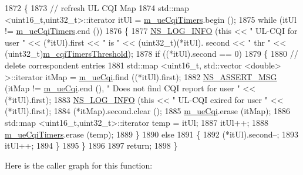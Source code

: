 \begin{DoxyCode}
1872 \{
1873   \textcolor{comment}{// refresh UL CQI  Map}
1874   std::map <uint16\_t,uint32\_t>::iterator itUl = \hyperlink{classns3_1_1RrFfMacScheduler_a348744ac7d5fc0c7d00d6df7efff37a4}{m\_ueCqiTimers}.begin ();
1875   \textcolor{keywordflow}{while} (itUl != \hyperlink{classns3_1_1RrFfMacScheduler_a348744ac7d5fc0c7d00d6df7efff37a4}{m\_ueCqiTimers}.end ())
1876     \{
1877       \hyperlink{group__logging_gafbd73ee2cf9f26b319f49086d8e860fb}{NS\_LOG\_INFO} (\textcolor{keyword}{this} << \textcolor{stringliteral}{" UL-CQI for user "} << (*itUl).first << \textcolor{stringliteral}{" is "} << (uint32\_t)(*itUl).
      second << \textcolor{stringliteral}{" thr "} << (uint32\_t)\hyperlink{classns3_1_1RrFfMacScheduler_a51ae1963d7d95e89917af4c603f08a91}{m\_cqiTimersThreshold});
1878       \textcolor{keywordflow}{if} ((*itUl).second == 0)
1879         \{
1880           \textcolor{comment}{// delete correspondent entries}
1881           std::map <uint16\_t, std::vector <double> >::iterator itMap = \hyperlink{classns3_1_1RrFfMacScheduler_aa19c6b6aafe91b47dbd96017fc913b40}{m\_ueCqi}.find ((*itUl).first);
1882           \hyperlink{assert_8h_aff5ece9066c74e681e74999856f08539}{NS\_ASSERT\_MSG} (itMap != \hyperlink{classns3_1_1RrFfMacScheduler_aa19c6b6aafe91b47dbd96017fc913b40}{m\_ueCqi}.end (), \textcolor{stringliteral}{" Does not find CQI report for user "}
       << (*itUl).first);
1883           \hyperlink{group__logging_gafbd73ee2cf9f26b319f49086d8e860fb}{NS\_LOG\_INFO} (\textcolor{keyword}{this} << \textcolor{stringliteral}{" UL-CQI exired for user "} << (*itUl).first);
1884           (*itMap).second.clear ();
1885           \hyperlink{classns3_1_1RrFfMacScheduler_aa19c6b6aafe91b47dbd96017fc913b40}{m\_ueCqi}.erase (itMap);
1886           std::map <uint16\_t,uint32\_t>::iterator temp = itUl;
1887           itUl++;
1888           \hyperlink{classns3_1_1RrFfMacScheduler_a348744ac7d5fc0c7d00d6df7efff37a4}{m\_ueCqiTimers}.erase (temp);
1889         \}
1890       \textcolor{keywordflow}{else}
1891         \{
1892           (*itUl).second--;
1893           itUl++;
1894         \}
1895     \}
1896 
1897   \textcolor{keywordflow}{return};
1898 \}
\end{DoxyCode}


Here is the caller graph for this function\+:



